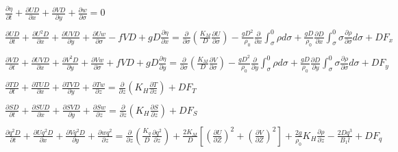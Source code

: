 \documentclass[oribibl]{llncs}
\begin{document}
\begin{eqnarray}
&&\frac{\partial \eta}{\partial t} + \frac{\partial UD}{\partial x}+ \frac{\partial VD}{\partial y}+ \frac{\partial w}{\partial \sigma}=0  \label{eq:final1}\\ 
\nonumber \\ 
&&\frac{\partial UD}{\partial t}  +\frac{\partial U^2D}{\partial x} +\frac{\partial UVD}{\partial y}+ \frac{\partial Uw}{\partial \sigma}-fVD+gD\frac{\partial \eta}{\partial x} = \frac{\partial}{\partial \sigma}\left( \frac{K_M}{D}\frac{\partial U}{\partial \sigma} \right) - \frac{gD^2}{\rho_0} \frac{\partial}{\partial x} \int_\sigma^0 \rho d \sigma + \frac{gD}{\rho_0}\frac{\partial D}{\partial x} \int_\sigma^0 \sigma \frac{\partial \rho}{\partial \sigma} d \sigma + DF_x  \label{eq:final2}\nonumber \\  
\\ 
&&\frac{\partial VD}{\partial t}  +\frac{\partial UVD}{\partial x} +\frac{\partial V^2D}{\partial y} + \frac{\partial Vw}{\partial \sigma} +fVD+gD\frac{\partial \eta}{\partial y} = \frac{\partial}{\partial \sigma}\left( \frac{K_M}{D}\frac{\partial V}{\partial \sigma} \right) - \frac{gD^2}{\rho_0} \frac{\partial}{\partial y} \int_\sigma^0 \rho d \sigma + \frac{gD}{\rho_0}\frac{\partial D}{\partial y} \int_\sigma^0 \sigma \frac{\partial \rho}{\partial \sigma} d \sigma + DF_y  \label{eq:final3}\nonumber \\  
\\  
&&\frac{\partial TD}{\partial t}+\frac{\partial TUD}{\partial x}+\frac{\partial TVD}{\partial y}+\frac{\partial Tw}{\partial z} = \frac{\partial}{\partial z}  \left ( K_H \frac{\partial T}{\partial z} \right) +D F_T  \label{eq:final4}\\ 
\nonumber \\ 
&&\frac{\partial SD}{\partial t}+\frac{\partial SUD}{\partial x}+\frac{\partial SVD}{\partial y}+\frac{\partial Sw}{\partial z} = \frac{\partial}{\partial z}  \left ( K_H \frac{\partial S}{\partial z} \right) +D F_S \label{eq:final5} \\ 
\nonumber \\ 
&&\frac{\partial q^2D}{\partial t} + \frac{\partial Uq^2D}{\partial x} +\frac{\partial Vq^2D}{\partial y} + \frac{\partial wq^2}{\partial z}  = \frac{\partial}{\partial z} \left( \frac{K_q}{D}  \frac{\partial q^2}{\partial z} \right)+\frac{2K_M}{D}\left[ \left( \frac{\partial U}{\partial Z}\right)^2 + \left( \frac{\partial V}{\partial Z}\right)^2 \right] + \frac{2g}{\rho_0}K_H\frac{\partial \rho}{\partial z} - \frac{2D q^3}{B_1 l} + D F_q  \label{eq:final6}\nonumber \\  

\end{eqnarray}
\end{document}
